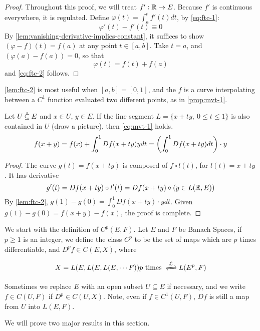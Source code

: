 \documentclass[../main-manifolds.tex]{subfiles}
\begin{document}
\begin{proof}
    Throughout this proof, we will treat $f': \mathbb{R}\to E$. Because $f'$ is continuous everywhere, it is regulated. Define $\varphi(t) = \int_a^t f'(t)dt$, by \cref{eq:ftc-1}:
    \[
        \varphi'(t) - f'(t)\equiv 0
    \]
    By \cref{lem:vanishing-derivative-implies-constant}, it suffices to show $(\varphi - f)(t) = f(a)$ at any point $t\in [a,b]$. Take $t = a$, and $(\varphi(a) - f(a)) = 0$, so that 
    \[
    \varphi(t) = f(t) + f(a)
    \]
    and \cref{eq:ftc-2} follows.
\end{proof}
\begin{remark}
    \cref{lem:ftc-2} is most useful when $[a,b] = [0,1]$, and the $f$ is a curve interpolating between a $C^1$ function evaluated two different points, as in \cref{prop:mvt-1}.
\end{remark}
%
\begin{wts}[MVT 1]\label{prop:mvt-1}
    Let $U\:\mathring{\subseteq}\: E$ and $x\in U$, $y\in E$. If the line segment $L = \{x + ty,\: 0\leq t\leq 1\}$ is also contained in $U$ (draw a picture), then \cref{eq:mvt-1} holds.
    \begin{equation}\label{eq:mvt-1}
        f(x+y) = f(x) + \int_0^1 Df(x+ty)ydt = \qty(\int_0^1 Df(x+ty)dt)\cdot y
    \end{equation}
\end{wts}
\begin{proof}
    The curve $g(t) = f(x+ty)$ is composed of $f\circ l(t)$, for $l(t) = x+ty$. It has derivative
    \[
        g'(t) = Df(x+ty)\circ l'(t) = Df(x+ty)\circ (y\in L(\mathbb{R},E))
    \]
    By \cref{lem:ftc-2}, $g(1)- g(0) =\int_0^1 Df(x+ty)\cdot y dt$. Given $g(1)-g(0) = f(x+y) - f(x)$, the proof is complete.
\end{proof}

\newpage
{}
We start with the definition of $C^p(E,F)$. Let $E$ and $F$ be Banach Spaces, if $p\geq 1$ is an integer, we define the class $C^p$ to be the set of maps which are $p$ times differentiable, and $D^p f\in C(E, X)$, where 

\[
    X = L(E, L(E, L(E,\cdots F))  p\text{ times }  \Isomor{L} L(E^p, F)
\]

Sometimes we replace $E$ with an open subset $U\subseteq E$ if necessary, and we write $f\in C(U,F)$ if $D^p\in C(U,X)$. Note, even if $f\in C^1(U,F)$, $Df$ is still a map from $U$ into $L(E,F)$. 

We will prove two major results in this section.
\end{document}
